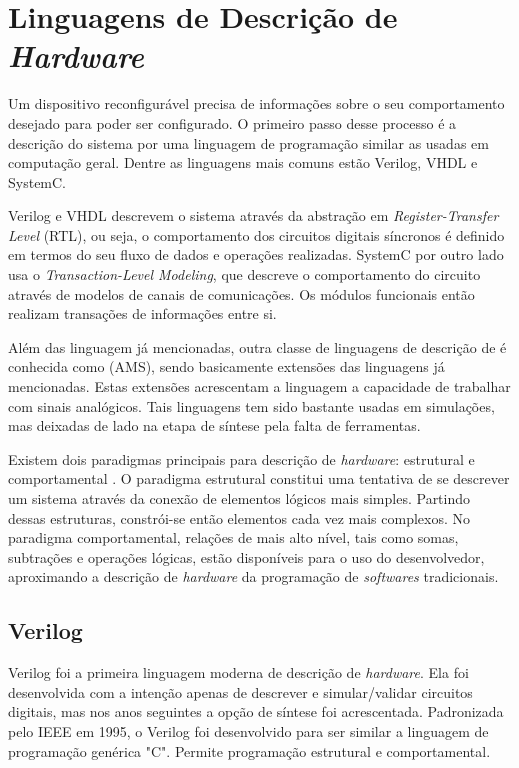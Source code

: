 \documentclass[11pt,a4paper,oneside]{book}
\begin{document}
\section{Linguagens de Descri\c{c}\~ao de \textit{Hardware}}
Um dispositivo reconfigur\'avel precisa de informa\c{c}\~oes sobre o seu comportamento desejado para poder ser configurado.
O primeiro passo desse processo \'e a descri\c{c}\~ao do sistema por uma linguagem de programa\c{c}\~ao similar as usadas em computa\c{c}\~ao geral.
Dentre as linguagens mais comuns est\~ao Verilog, VHDL e SystemC.

Verilog e VHDL descrevem o sistema atrav\'es da abstra\c{c}\~ao em \textit{Register-Transfer Level} (RTL), ou seja, o comportamento dos circuitos digitais s\'i­ncronos \'e definido em termos do seu fluxo de dados e opera\c{c}\~oes realizadas.
SystemC por outro lado usa o \textit{Transaction-Level Modeling}, que descreve o comportamento do circuito atrav\'es de modelos de canais de comunica\c{c}\~oes.
Os m\'odulos funcionais ent\~ao realizam transa\c{c}\~oes de informa\c{c}\~oes entre si.

Al\'em das linguagem j\'a mencionadas, outra classe de linguagens de descri\c{c}\~ao de  \'e conhecida como  (AMS), sendo basicamente extens\~oes das linguagens j\'a mencionadas.
Estas extens\~oes acrescentam a linguagem a capacidade de trabalhar com sinais anal\'ogicos.
Tais linguagens tem sido bastante usadas em simula\c{c}\~oes, mas deixadas de lado na etapa de s\'i­ntese pela falta de ferramentas.

Existem dois paradigmas principais para descrição de \textit{hardware}: estrutural e comportamental \cite{Thomas1996}.
O paradigma estrutural constitui uma tentativa de se descrever um sistema através da conexão de elementos lógicos mais simples.
Partindo dessas estruturas, constrói-se então elementos cada vez mais complexos.
No paradigma comportamental, relações de mais alto nível, tais como somas, subtrações e operações lógicas, estão disponíveis para o uso do desenvolvedor, aproximando a descrição de \textit{hardware} da programação de \textit{softwares} tradicionais.

\subsection{Verilog}
Verilog foi a primeira linguagem moderna de descri\c{c}\~ao de \textit{hardware}.
Ela foi desenvolvida com a inten\c{c}\~ao apenas de descrever e simular/validar circuitos digitais, mas nos anos seguintes a op\c{c}\~ao de s\'i­ntese foi acrescentada.
Padronizada pelo IEEE em 1995, o Verilog foi desenvolvido para ser similar a linguagem de programa\c{c}\~ao gen\'erica "C".
Permite programação estrutural e comportamental.
\end{document}
